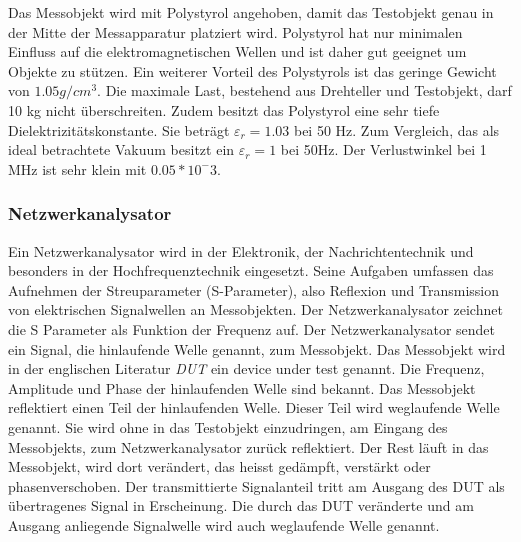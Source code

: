 Das Messobjekt wird mit Polystyrol angehoben, damit das Testobjekt genau in der Mitte der Messapparatur platziert wird. Polystyrol hat nur minimalen Einfluss auf die elektromagnetischen Wellen und ist daher gut geeignet um Objekte zu stützen. Ein weiterer Vorteil des Polystyrols ist das geringe Gewicht von $1.05 g/cm^3$. Die maximale Last, bestehend aus Drehteller und Testobjekt, darf  10 kg  nicht überschreiten. Zudem besitzt das Polystyrol eine sehr tiefe Dielektrizitätskonstante. Sie beträgt $\varepsilon_r=1.03$ bei 50 Hz. Zum Vergleich, das als ideal betrachtete Vakuum  besitzt ein $\varepsilon_r=1$ bei 50Hz. Der Verlustwinkel bei 1 MHz ist sehr klein mit $0.05*10^-3$.
\cite{StarLab,Polystyrol_Datenblatt,WikiPermitt} 


\subsubsection{Netzwerkanalysator}
Ein Netzwerkanalysator wird in der Elektronik, der Nachrichtentechnik und besonders in der Hochfrequenztechnik eingesetzt. Seine Aufgaben umfassen das Aufnehmen der Streuparameter (S-Parameter), also Reflexion und Transmission von elektrischen Signalwellen an
Messobjekten. Der Netzwerkanalysator zeichnet die S Parameter als Funktion der Frequenz auf. Der Netzwerkanalysator sendet ein Signal, die  hinlaufende Welle genannt, zum  Messobjekt. Das Messobjekt wird in der englischen Literatur  \textit{DUT} ein device under test genannt. Die  Frequenz, Amplitude und Phase der hinlaufenden Welle sind bekannt. Das Messobjekt reflektiert einen Teil der hinlaufenden Welle. Dieser Teil wird weglaufende Welle genannt. Sie wird ohne in das Testobjekt einzudringen, am Eingang des Messobjekts, zum Netzwerkanalysator zurück reflektiert. Der Rest läuft in das Messobjekt, wird dort verändert, das heisst gedämpft, verstärkt oder phasenverschoben. Der transmittierte Signalanteil tritt am Ausgang des DUT als übertragenes Signal in Erscheinung. Die durch das DUT veränderte und am Ausgang anliegende Signalwelle wird auch  weglaufende Welle genannt.

